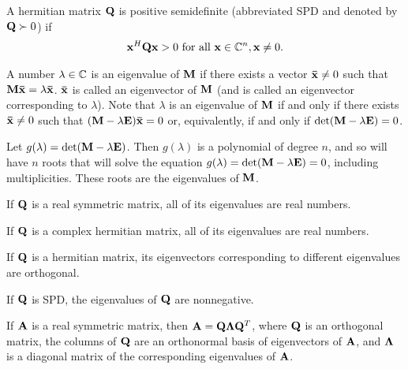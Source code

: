 \begin{definition}{}{}
    A hermitian matrix $\bold{Q}$ is positive semidefinite (abbreviated SPD and denoted by $\bold{Q}\succ 0$) if 
    \begin{align*}
        \bold{x}^H\bold{Q}\bold{x}> 0 \text{ for all } \bold{x}\in \mathbb{C}^n, \bold{x}\neq 0.
    \end{align*}
\end{definition}

A number $\lambda\in\mathbb{C}$ is an eigenvalue of $\bold{M}$ if there exists 
a vector $\bold{\bar{x}}\neq 0$ such that $\bold{M}\bold{\bar{x}}=\lambda \bold{\bar{x}}$.
$\bold{\bar{x}}$ is called an eigenvector of $\bold{M}$ (and is called an eigenvector corresponding to $\lambda$).
Note that $\lambda$ is an eigenvalue of $\bold{M}$ if and only if there exists $\bold{\bar{x}}\neq 0$ such that 
$(\bold{M}-\lambda \bold{E})\bold{\bar{x}}=0$ or, equivalently, if and only if $\text{det}(\bold{M}-\lambda \bold{E})=0$.

Let $g(\lambda)=\text{det}(\bold{M}-\lambda \bold{E})$. Then $g(\lambda)$ is 
a polynomial of degree $n$, and so will have $n$ roots 
that will solve the equation $g(\lambda)=\text{det}(\bold{M}-\lambda \bold{E})=0$, 
including multiplicities. These roots are the eigenvalues of $\bold{M}$.


\begin{proposition}{}{}
    If $\bold{Q}$ is a real symmetric matrix, all of its eigenvalues are real numbers.
\end{proposition}

\begin{proposition}{}{}
    If $\bold{Q}$ is a complex hermitian matrix, all of its eigenvalues are real numbers.
\end{proposition}

\begin{proposition}{}{}
    If $\bold{Q}$ is a hermitian matrix, 
    its eigenvectors corresponding to different eigenvalues are orthogonal.
\end{proposition}

\begin{proposition}{}{}
    If $\bold{Q}$ is SPD, the eigenvalues of $\bold{Q}$ are nonnegative.
\end{proposition}

\begin{theorem}{}{}
    If $\bold{A}$ is a real symmetric matrix, then $\bold{A}=\bold{Q}\bold{\Lambda}\bold{Q}^T$,
    where $\bold{Q}$ is an orthogonal matrix, the columns of $\bold{Q}$ are an orthonormal basis of eigenvectors of $\bold{A}$,
    and $\bold{\Lambda}$ is a diagonal matrix of the corresponding eigenvalues of $\bold{A}$.
\end{theorem}


